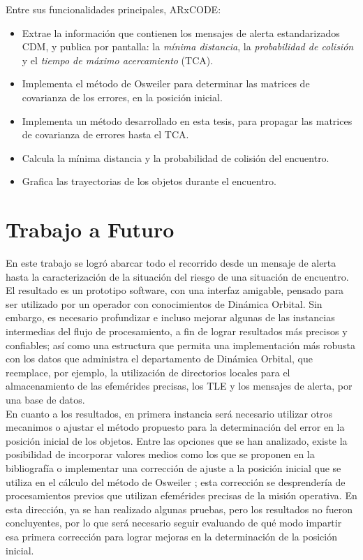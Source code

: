 Entre sus funcionalidades principales, ARxCODE:

\begin{itemize}
 \item Extrae la informaci\'on que contienen los mensajes de alerta estandarizados CDM, y publica por pantalla: la {\it{m\'inima distancia}}, la {\it{probabilidad de colisi\'on}} y el {\it{tiempo de m\'aximo acercamiento}} (TCA). 
 \item Implementa el m\'etodo de Osweiler \citep{osweiler} para determinar las matrices de covarianza de los errores, en la posici\'on inicial.
 \item Implementa un m\'etodo desarrollado en esta tesis, para propagar las matrices de covarianza de errores hasta el TCA.
 \item Calcula la m\'inima distancia y la probabilidad de colisi\'on del encuentro.
 \item Grafica las trayectorias de los objetos durante el encuentro.
\end{itemize}


\section*{Trabajo a Futuro}

En este trabajo se logr\'o abarcar todo el recorrido desde un mensaje de alerta hasta la caracterizaci\'on de la situaci\'on del riesgo de una situaci\'on de encuentro. El resultado es un prototipo software, con una interfaz amigable, pensado para ser utilizado por un operador con conocimientos de Din\'amica Orbital. Sin embargo, es necesario profundizar e incluso mejorar algunas de las instancias intermedias del flujo de procesamiento, a fin de lograr resultados m\'as precisos y confiables; as\'i como una estructura que permita una implementaci\'on m\'as robusta con los datos que administra el departamento de Din\'amica Orbital, que reemplace, por ejemplo, la utilizaci\'on de directorios locales para el almacenamiento de las efem\'erides precisas, los TLE y los mensajes de alerta, por una base de datos.\\

En cuanto a los resultados, en primera instancia ser\'a necesario utilizar otros mecanimos o ajustar el m\'etodo propuesto para la determinaci\'on del error en la posici\'on inicial de los objetos. Entre las opciones que se han analizado, existe la posibilidad de incorporar valores medios como los que se proponen en la bibliograf\'ia o implementar una correcci\'on de ajuste a la posici\'on inicial que se utiliza en el c\'alculo del m\'etodo de Osweiler \citep{osweiler}; esta correcci\'on se desprender\'ia de procesamientos previos que utilizan efem\'erides precisas de la misi\'on operativa. En esta direcci\'on, ya se han realizado algunas pruebas, pero los resultados no fueron concluyentes, por lo que ser\'a necesario seguir evaluando de qu\'e modo impartir esa primera correcci\'on para lograr mejoras en la determinaci\'on de la posici\'on inicial.\\

